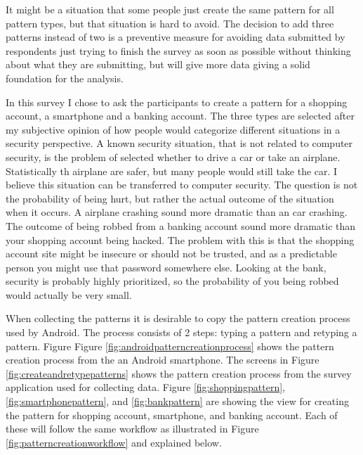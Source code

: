       It might be a situation that some people just create the same pattern for all pattern types, but that situation is hard to avoid. The decision to add three patterns instead of two is a preventive measure for avoiding data submitted by respondents just trying to finish the survey as soon as possible without thinking about what they are submitting, but will give more data giving a solid foundation for the analysis. 

      In this survey I chose to ask the participants to create a pattern for a shopping account, a smartphone and a banking account. The three types are selected after my subjective opinion of how people would categorize different situations in a security perspective. A known security situation, that is not related to computer security, is the problem of selected whether to drive a car or take an airplane. Statistically th airplane are safer, but many people would still take the car. I believe this situation can be transferred to computer security. The question is not the probability of being hurt, but rather the actual outcome of the situation when it occurs. A airplane crashing sound more dramatic than an car crashing. The outcome of being robbed from a banking account sound more dramatic than your shopping account being hacked. The problem with this is that the shopping account site might be insecure or should not be trusted, and as a predictable person you might use that password somewhere else. Looking at the bank, security is probably highly prioritized, so the probability of you being robbed would actually be very small. 

      When collecting the patterns it is desirable to copy the pattern creation process used by Android. The process consists of 2 steps: typing a pattern and retyping a pattern. Figure Figure \ref{fig:androidpatterncreationprocess} shows the pattern creation process from the an Android smartphone. The screens in Figure \ref{fig:createandretypepatterns} shows the pattern creation process from the survey application used for collecting data. Figure \ref{fig:shoppingpattern}, \ref{fig:smartphonepattern}, and \ref{fig:bankpattern} are showing the view for creating the pattern for shopping account, smartphone, and banking account. Each of these will follow the same workflow as illustrated in Figure \ref{fig:patterncreationworkflow} and explained below. 

